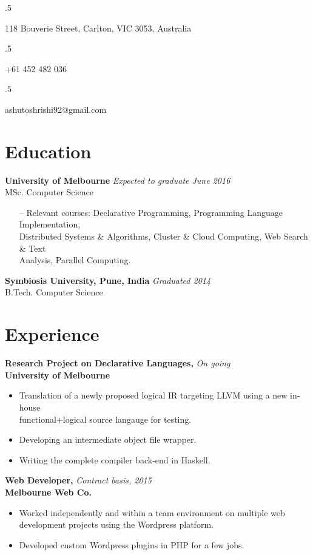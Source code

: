 \documentclass[overlapped]{res}
\begin{document}


\begin{resume}
  \moveleft.5\hoffset\centerline{118 Bouverie Street, Carlton, VIC 3053, Australia}
  \moveleft.5\hoffset\centerline{+61 452 482 036}
  \moveleft.5\hoffset\centerline{ashutoshrishi92@gmail.com}
  
  \section{Education}  
  \textbf{University of Melbourne} \hfill \textit{Expected to graduate June 2016} \\
  MSc. Computer Science 
  \begin{itemize} \itemsep -2pt
  \item[--] Relevant courses: Declarative Programming, 
    Programming Language Implementation, \\ Distributed Systems \&
    Algorithms, Cluster \& Cloud Computing, Web Search \& Text \\ 
    Analysis, Parallel Computing.
  \end{itemize}

  \textbf{Symbiosis University, Pune, India} \hfill \textit{Graduated 2014} \\
  B.Tech. Computer Science 


  \section{Experience}
  \textbf{Research Project on Declarative Languages,} \hfill \textit{On going}\\
  \textbf{University of Melbourne}
  \begin{itemize}
  \item Translation of a newly proposed logical IR targeting LLVM using a new
    in-house \\ functional+logical source langauge for testing.
  \item Developing an intermediate object file wrapper.
  \item Writing the complete compiler back-end in Haskell.
  \end{itemize}

  \textbf{Web Developer,} \hfill \textit{Contract basis, 2015}\\
  \textbf{Melbourne Web Co.}
  \begin{itemize}
  \item Worked independently and within a team environment on multiple web 
    development projects using the Wordpress platform.
  \item Developed custom Wordpress plugins in PHP for a few jobs.  
  \end{itemize}


\end{resume}
\end{document}
